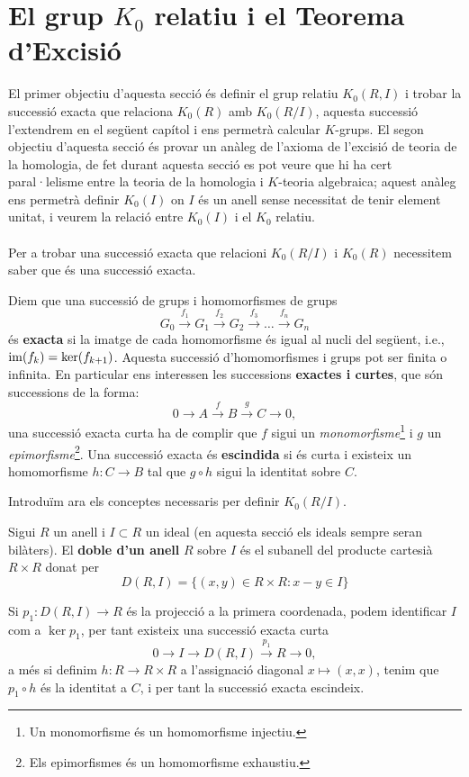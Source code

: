 \section{El grup $K_0$ relatiu i el Teorema d'Excisió}
El primer objectiu d'aquesta secció és definir el grup relatiu $K_0(R,I)$ i trobar la successió exacta que relaciona $K_0(R)$ amb $K_0(R/I)$, aquesta successió l'extendrem en el següent capítol i ens permetrà calcular $K$-grups. El segon objectiu d'aquesta secció és provar un anàleg de l'axioma de l'excisió de teoria de la homologia, de fet durant aquesta secció es pot veure que hi ha cert paral·lelisme entre la teoria de la homologia i $K$-teoria algebraica; aquest anàleg ens permetrà definir $K_0(I)$ on $I$ és un anell sense necessitat de tenir element unitat, i veurem la relació entre $K_0(I)$ i el $K_0$ relatiu. \\ \\
\indent  Per a trobar una successió exacta que relacioni $K_0(R/I)$ i $K_0(R)$ necessitem saber que és una successió exacta.
\begin{definition}
Diem que una successió de grups i homomorfismes de grups 
$$
G_0 \xrightarrow{f_1} G_1 \xrightarrow{f_2} G_2 \xrightarrow{f_3} \dots \xrightarrow{f_n} G_n
$$
és \textbf{exacta} si la imatge de cada homomorfisme és igual al nucli del següent, i.e., $\mathrm{im} (f_k) = \ker (f_{k+1})$. Aquesta successió d'homomorfismes i grups pot ser finita o infinita.  En particular ens interessen les successions \textbf{exactes  i curtes}, que són successions de la forma:
$$
0 \rightarrow A \xrightarrow{f} B \xrightarrow{g} C \rightarrow 0,
$$
una successió exacta curta ha de complir que $f$ sigui un \textit{monomorfisme}\footnote{Un monomorfisme és un homomorfisme injectiu.} i $g$ un \textit{epimorfisme}\footnote{Els epimorfismes és un homomorfisme exhaustiu.}. Una successió exacta és \textbf{escindida} si és curta i existeix un homomorfisme $h: C\rightarrow B$ tal que $g\circ h$ sigui la identitat sobre $C$.
\end{definition}
Introduïm ara els conceptes necessaris per definir $K_0(R/I)$.
\begin{definition}
Sigui $R$ un anell i $I\subset R$ un ideal (en aquesta secció els ideals sempre seran bilàters). El \textbf{doble d'un anell} $R$ sobre $I$ és el subanell del producte cartesià $R\times R$ donat per
$$
D(R,I) = \{ (x,y)\in R\times R: x-y\in I \}
$$


\end{definition}

\begin{obs}
Si $p_1: D(R,I) \rightarrow R$ és la projecció a la primera coordenada, podem identificar $I$ com a $\ker p_1$, per tant existeix una successió exacta curta
$$
0 \rightarrow I \rightarrow D(R,I) \xrightarrow{p_1} R\rightarrow 0,
$$
a més si definim $h: R \rightarrow R\times R$ a l'assignació diagonal $x\mapsto (x,x)$, tenim que $p_1 \circ h$ és la identitat a $C$, i per tant la successió exacta escindeix.

\end{obs}

